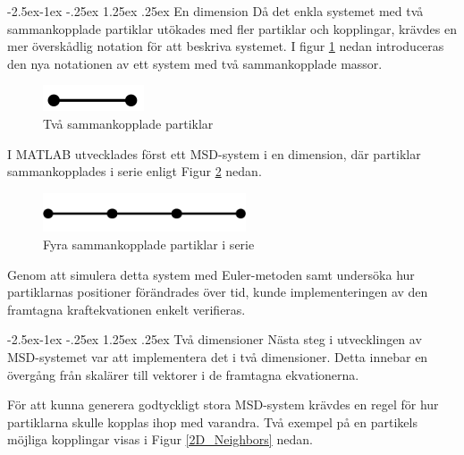 \documentclass[a4paper,12pt,oneside,final,swedish]{extarticle}
\makeatletter
\renewcommand\paragraph{\@startsection{paragraph}{4}{\z@}%
            {-2.5ex\@plus -1ex \@minus -.25ex}%
            {1.25ex \@plus .25ex}%
            {\normalfont\normalsize\bfseries}}
\makeatother
\begin{document}
\paragraph{En dimension}
Då det enkla systemet med två sammankopplade partiklar utökades med fler partiklar och kopplingar, krävdes en mer överskådlig notation för att beskriva systemet. 
I figur \ref{2D_simple} nedan introduceras den nya notationen av ett system med två sammankopplade massor.

\begin{figure}[h!]
  \begin{center}
    \includegraphics[width=3cm]{Bilder/2D_simple.png} 
  \end{center}
  \caption{Två sammankopplade partiklar}
  \label{2D_simple}
\end{figure}
\noindent I MATLAB utvecklades först ett MSD-system i en dimension, där partiklar sammankopplades i serie enligt Figur \ref{simple1D4} nedan.
\begin{figure}[h!]
  \begin{center}
    \includegraphics[width=6cm]{Bilder/simple1D4.png} 
  \end{center}
  \caption{Fyra sammankopplade partiklar i serie}
  \label{simple1D4}
\end{figure}

\noindent Genom att simulera detta system med Euler-metoden samt undersöka hur partiklarnas positioner förändrades över tid, kunde implementeringen av den framtagna kraftekvationen enkelt verifieras.

\paragraph{Två dimensioner}
Nästa steg i utvecklingen av MSD-systemet var att implementera det i två dimensioner. 
Detta innebar en övergång från skalärer till vektorer i de framtagna ekvationerna.
\pagebreak


\noindent För att kunna generera godtyckligt stora MSD-system krävdes en regel för hur partiklarna skulle kopplas ihop med varandra. Två exempel på en partikels möjliga kopplingar visas i Figur \ref{2D_Neighbors} nedan.
\end{document}
